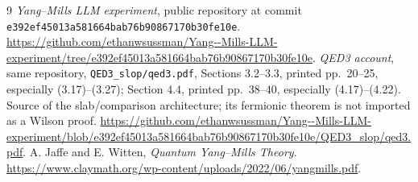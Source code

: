 \documentclass[11pt]{article}
\theoremstyle{remark}
\begin{document}
\begin{thebibliography}{9}
\emph{Yang--Mills LLM experiment}, public repository at
commit \texttt{e392ef4501\allowbreak 3a581664ba\allowbreak b76b908671\allowbreak 70b30fe10e}.
\url{https://github.com/ethanwsussman/Yang--Mills-LLM-experiment/tree/e392ef45013a581664bab76b90867170b30fe10e}.
\emph{QED3 account}, same repository,
\texttt{QED3\_slop/qed3.pdf}, Sections 3.2--3.3, printed pp.~20--25,
especially (3.17)--(3.27); Section 4.4, printed pp.~38--40,
especially (4.17)--(4.22). Source of the slab/comparison architecture;
its fermionic theorem is not imported as a Wilson proof.
\url{https://github.com/ethanwsussman/Yang--Mills-LLM-experiment/blob/e392ef45013a581664bab76b90867170b30fe10e/QED3_slop/qed3.pdf}.
A. Jaffe and E. Witten, \emph{Quantum Yang--Mills Theory}.
\url{https://www.claymath.org/wp-content/uploads/2022/06/yangmills.pdf}.
\end{thebibliography}
\end{document}

